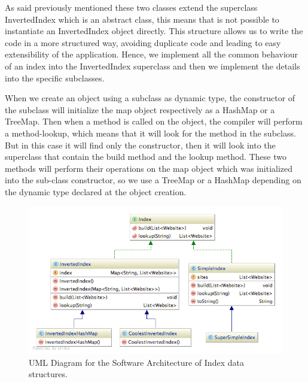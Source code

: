 As said previously mentioned these two classes extend the superclass InvertedIndex which is an abstract class, this means that is not possible to instantiate an InvertedIndex object directly. This structure allows us to write the code in a more structured way, avoiding duplicate code and leading to easy extensibility of the application. Hence, we implement all the common behaviour of an index into the InvertedIndex superclass and then we implement the details into the specific subclasses.

When we create an object using a subclass as dynamic type, the constructor of the subclass will initialize the map object respectively as a HashMap or a TreeMap. Then when a method is called on the object, the compiler will perform a method-lookup, which means that it will look for the method in the subclass. But in this case it will find only the constructor, then it will look into the superclass that contain the build method and the lookup method. These two methods will perform their operations on the map object which was initialized into the sub-class constructor, so we use a TreeMap or a HashMap depending on the dynamic type declared at the object creation.


\begin{figure}[t]
	\centering
	\includegraphics[width=\textwidth]{graphics/diagram-index.png}
	\caption{UML Diagram for the Software Architecture of Index data structures.}
	\label{fig:index:uml}
\end{figure}



